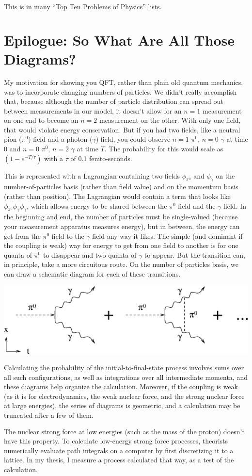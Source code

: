 \documentclass[12pt]{article}
\begin{document}
This is in many ``Top Ten Problems of Physics'' lists.

\section{Epilogue: So What Are All Those Diagrams?}

My motivation for showing you QFT, rather than plain old quantum
mechanics, was to incorporate changing numbers of particles.  We
didn't really accomplish that, because although the number of particle
distribution can spread out between measurements in our model, it
doesn't allow for an $n=1$ measurement on one end to become an $n=2$
measurement on the other.  With only one field, that would violate
energy conservation.  But if you had two fields, like a neutral pion
($\pi^0$) field and a photon ($\gamma$) field, you could observe $n =
1$ $\pi^0$, $n = 0$ $\gamma$ at time $0$ and $n = 0$ $\pi^0$, $n = 2$
$\gamma$ at time $T$.  The probability for this would scale as $(1 -
e^{-T/\tau})$ with a $\tau$ of 0.1 femto-seconds.

This is represented with a Lagrangian containing two fields
$\phi_{\pi^0}$ and $\phi_\gamma$ on the number-of-particles basis
(rather than field value) and on the momentum basis (rather than
position).  The Lagrangian would contain a term that looks like
$\phi_{\pi^0} \phi_\gamma \phi_\gamma$, which allows energy to be
shared between the $\pi^0$ field and the $\gamma$ field.  In the
beginning and end, the number of particles must be single-valued
(because your measurement apparatus measures energy), but in between,
the energy can get from the $\pi^0$ field to the $\gamma$ field any
way it likes.  The simple (and dominant if the coupling is weak) way
for energy to get from one field to another is for one quanta of
$\pi^0$ to disappear and two quanta of $\gamma$ to appear.  But the
transition can, in principle, take a more circuitous route.  On the
number of particles basis, we can draw a schematic diagram for each of
these transitions.
\begin{center}
  \includegraphics[width=0.6\linewidth]{fig4.eps}
\end{center}
Calculating the probability of the initial-to-final-state process
involves sums over all such configurations, as well as integrations
over all intermediate momenta, and these diagrams help organize the
calculation.  Moreover, if the coupling is weak (as it is for
electrodynamics, the weak nuclear force, and the strong nuclear force
at large energies), the series of diagrams is geometric, and a
calculation may be truncated after a few of them.

The nuclear strong force at low energies (such as the mass of the
proton) doesn't have this property.  To calculate low-energy strong
force processes, theorists numerically evaluate path integrals on a
computer by first discretizing it to a lattice.  In my thesis, I
measure a process calculated that way, as a test of the calculation.
\end{document}
